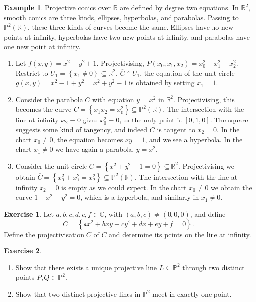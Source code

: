 \documentclass{article}
\newcommand{\R}{\mathbb{R}}
\newcommand{\C}{\mathbb{C}}
\renewcommand{\P}{\mathbb{P}}
\newcommand{\rb}[1]{\left( #1 \right)}
\renewcommand{\sb}[1]{\left[ #1 \right]}
\newcommand{\cb}[1]{\left\{ #1 \right\}}
\theoremstyle{definition}\newtheorem{definition}{Definition}[section]
\theoremstyle{definition}\newtheorem{notation}[definition]{Notation}
\theoremstyle{definition}\newtheorem{remark}[definition]{Remark}
\theoremstyle{definition}\newtheorem{example}[definition]{Example}
\theoremstyle{definition}\newtheorem{fact}{Fact}
\theoremstyle{definition}\newtheorem{exercise}{Exercise}
\begin{document}
\begin{example}
Projective conics over $ \R $ are defined by degree two equations. In $ \R^2 $, smooth conics are three kinds, ellipses, hyperbolas, and parabolas. Passing to $ \P^2\rb{\R} $, these three kinds of curves become the same. Ellipses have no new points at infinity, hyperbolas have two new points at infinity, and parabolas have one new point at infinity.
\begin{enumerate}
\item Let $ f\rb{x, y} = x^2 - y^2 + 1 $. Projectivising, $ P\rb{x_0, x_1, x_2} = x_0^2 - x_1^2 + x_2^2 $. Restrict to $ U_1 = \cb{x_1 \ne 0} \subseteq \R^2 $. $ \overline{C} \cap U_1 $, the equation of the unit circle $ g\rb{x, y} = x^2 - 1 + y^2 = x^2 + y^2 - 1 $ is obtained by setting $ x_1 = 1 $.
\item Consider the parabola $ C $ with equation $ y = x^2 $ in $ \R^2 $. Projectivising, this becomes the curve $ \overline{C} = \cb{x_1x_2 = x_0^2} \subseteq \P^2\rb{\R} $. The intersection with the line at infinity $ x_2 = 0 $ gives $ x_0^2 = 0 $, so the only point is $ \sb{0, 1, 0} $. The square suggests some kind of tangency, and indeed $ \overline{C} $ is tangent to $ x_2 = 0 $. In the chart $ x_0 \ne 0 $, the equation becomes $ xy = 1 $, and we see a hyperbola. In the chart $ x_1 \ne 0 $ we have again a parabola, $ y = x^2 $.
\item Consider the unit circle $ C = \cb{x^2 + y^2 - 1 = 0} \subseteq \R^2 $. Projectivising we obtain $ \overline{C} = \cb{x_0^2 + x_1^2 = x_2^2} \subseteq \P^2\rb{\R} $. The intersection with the line at infinity $ x_2 = 0 $ is empty as we could expect. In the chart $ x_0 \ne 0 $ we obtain the curve $ 1 + x^2 - y^2 = 0 $, which is a hyperbola, and similarly in $ x_1 \ne 0 $.
\end{enumerate}
\end{example}

\begin{exercise}
Let $ a, b, c, d, e, f \in \C $, with $ \rb{a, b, c} \ne \rb{0, 0, 0} $, and define
$$ C = \cb{ax^2 + bxy + cy^2 + dx + ey + f = 0}. $$
Define the projectivisation $ \overline{C} $ of $ C $ and determine its points on the line at infinity.
\end{exercise}

\begin{exercise}
\label{ex:18}
\hfill
\begin{enumerate}
\item Show that there exists a unique projective line $ L \subseteq \P^2 $ through two distinct points $ P, Q \in \P^2 $.
\item Show that two distinct projective lines in $ \P^2 $ meet in exactly one point.
\end{enumerate}
\end{exercise}
\end{document}
